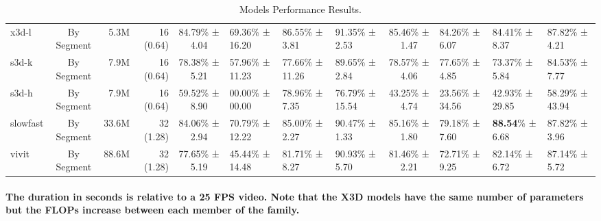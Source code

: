 \begin{table*}[t]
{\begin{tabular}{lcrr||c|lll||c|lll}
            x3d-l & By Segment & 5.3M & 16 (0.64) & 84.79\% ± 4.04 & 69.36\% ± 16.20 & 86.55\% ± 3.81 & 91.35\% ± 2.53 & 85.46\% ± 1.47 & 84.26\% ± 6.07 & 84.41\% ± 8.37 & 87.82\% ± 4.21 \\
            s3d-k & By Segment & 7.9M & 16 (0.64) & 78.38\% ± 5.21 & 57.96\% ± 11.23 & 77.66\% ± 11.26 & 89.65\% ± 2.84 & 78.57\% ± 4.06 & 77.65\% ± 4.85 & 73.37\% ± 5.84 & 84.53\% ± 7.77 \\
            s3d-h & By Segment & 7.9M & 16 (0.64) & 59.52\% ± 8.90 & 00.00\% ± 00.00 & 78.96\% ± 7.35 & 76.79\% ± 15.54 & 43.25\% ± 4.74 & 23.56\% ± 34.56 & 42.93\% ± 29.85 & 58.29\% ± 43.94 \\
            slowfast & By Segment & 33.6M & 32 (1.28) & 84.06\% ± 2.94 & 70.79\% ± 12.22 & 85.00\% ± 2.27 & 90.47\% ± 1.33 & 85.16\% ± 1.80 & 79.18\% ± 7.60 & \textbf{88.54}\% ± 6.68 & 87.82\% ± 3.96 \\
            vivit & By Segment & 88.6M & 32 (1.28) & 77.65\% ± 5.19 & 45.44\% ± 14.48 & 81.71\% ± 8.27 & 90.93\% ± 5.70 & 81.46\% ± 2.21 & 72.71\% ± 9.25 & 82.14\% ± 6.72 & 87.14\% ± 5.72 \\
            \bottomrule
        \end{tabular}
    }
    \vspace{-2ex}
    \centering
    \caption{Models Performance Results.}
    \paragraph{
        The duration in seconds is relative to a 25 FPS video. Note that the X3D  models have the same number of parameters but the FLOPs increase between each member of the family.
    }
    \label{table:training-results}
\end{table*}
    